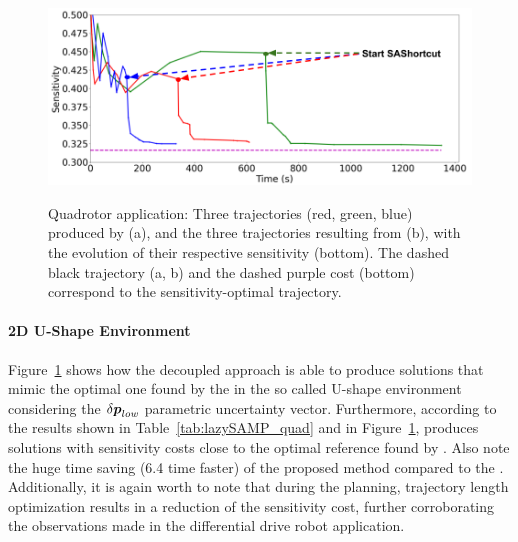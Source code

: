 

\begin{figure}[t!]
    \centering
    \\
    \includegraphics[width=0.55\linewidth]{figures/samp/U_shape_3in1_sensi.png}
    \caption{Quadrotor application: Three trajectories (red, green, blue) produced by  (a), and the three trajectories resulting from  (b), with the evolution of their respective sensitivity (bottom). 
    The dashed black trajectory (a, b) and the dashed purple cost (bottom) correspond to the  sensitivity-optimal trajectory.}
    \label{fig:U_shape}
\end{figure}

\paragraph{2D U-Shape Environment} 

Figure~\ref{fig:U_shape} shows how the decoupled approach is able to produce solutions that mimic the optimal one found by the  in the so called U-shape environment considering the $\delta\boldsymbol{p}_{low}$ parametric uncertainty vector.
Furthermore, according to the results shown in Table~\ref{tab:lazySAMP_quad} and in Figure~\ref{fig:U_shape},  produces solutions with sensitivity costs close to the optimal reference found by . 
Also note the huge time saving (6.4 time faster) of the proposed method compared to the .
Additionally, it is again worth to note that during the  planning, trajectory length optimization results in a reduction of the sensitivity cost, further corroborating the observations made in the differential drive robot application.

